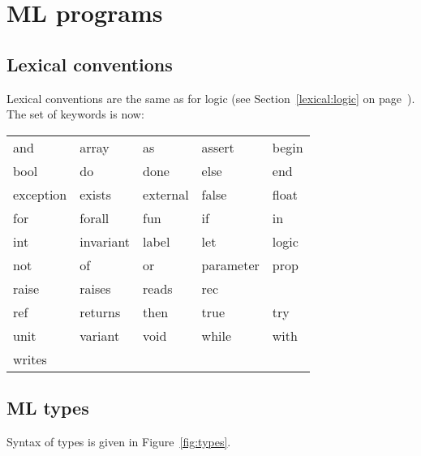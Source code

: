\documentclass[a4paper,12pt]{report}
\begin{document}
\section{ML programs}
\label{syntax:ml}

\subsection{Lexical conventions}
\label{lexical:ml}

Lexical conventions are the same as for logic (see
Section~\ref{lexical:logic} on page~\pageref{lexical:logic}).
The set of keywords is now:
\begin{center}
{\tt\begin{tabular}{l@{\qquad}l@{\qquad}l@{\qquad}l@{\qquad}l}
and & array & as & assert & begin \\
bool & do & done & else & end \\
exception & exists & external & false & float  \\
for & forall & fun & if & in  \\
int & invariant & label & let & logic \\
not & of & or & parameter & prop  \\
raise & raises & reads & rec  \\
ref & returns & then & true & try  \\
unit & variant & void & while & with \\
writes
\end{tabular}}
\end{center}

\subsection{ML types}
\label{syntax:mltypes}

Syntax of types is given in Figure~\ref{fig:types}.
\end{document}
